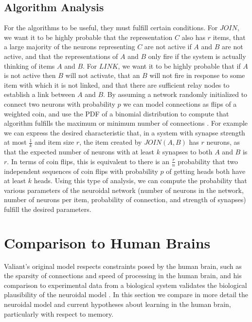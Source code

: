\documentclass[letterpaper, 12pt]{article}
\begin{document}
\subsection{Algorithm Analysis}
For the algorithms to be useful, they must fulfill certain conditions. For $JOIN$, we want it to be highly probable that the representation $C$ also has $r$ items, that a large majority of the neurons representing $C$ are not active if $A$ and $B$ are not active, and that the representations of $A$ and $B$ only fire if the system is actually thinking of items $A$ and $B$. For $LINK$, we want it to be highly probable that if $A$ is not active then $B$ will not activate, that an $B$ will not fire in response to some item with which it is not linked, and that there are sufficient relay nodes to establish a link between $A$ and $B$. By assuming a network randomly initialized to connect two neurons with probability $p$ we can model connections as flips of a weighted coin, and use the PDF of a binomial distribution to compute that algorithm fulfills the maximum or minimum number of connections \cite{valiant_memorization_2005}. For example we can express the desired characteristic that, in a system with synapse strength at most $\frac{1}{k}$ and item size $r$, the item created by $JOIN(A, B)$ has $r$ neurons, as that the expected number of neurons with at least $k$ synapses to both $A$ and $B$ is $r$. In terms of coin flips, this is equivalent to there is an $\frac{r}{n}$ probability that two independent sequences of coin flips with probability $p$ of getting heads both have at least $k$ heads. Using this type of analysis, we can compute the probability that various parameters of the neuroidal network (number of neurons in the network, number of neurons per item, probability of connection, and strength of synapses) fulfill the desired parameters.

\section{Comparison to Human Brains}
Valiant's original model respects constraints posed by the human brain, such as the sparsity of connections and speed of processing in the human brain, and his comparison to experimental data from a biological system validates the biological plausibility of the neuroidal model \cite{valiant_quantitative_2006}. In this section we compare in more detail the neuroidal model and current hypotheses about learning in the human brain, particularly with respect to memory.
\end{document}
